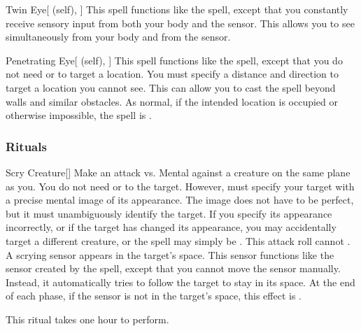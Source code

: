 \lowercase{\hypertarget{spell:Twin Eye}{}}\label{spell:Twin Eye}
\begin{attuneability}[\nth{3}]{\hypertarget{spell:Twin Eye}{Twin Eye}}[ (self), ]
This spell functions like the  spell, except that you constantly receive sensory input from both your body and the sensor.
This allows you to see simultaneously from your body and from the sensor.
\end{attuneability}
\vspace{0.25em}



\lowercase{\hypertarget{spell:Penetrating Eye}{}}\label{spell:Penetrating Eye}
\begin{attuneability}[\nth{4}]{\hypertarget{spell:Penetrating Eye}{Penetrating Eye}}[ (self), ]
This spell functions like the  spell, except that you do not need  or  to target a location.
You must specify a distance and direction to target a location you cannot see.
This can allow you to cast the spell beyond walls and similar obstacles.
As normal, if the intended location is occupied or otherwise impossible, the spell is .
\end{attuneability}
\vspace{0.25em}



\subsubsection{Rituals}


\lowercase{\hypertarget{spell:Scry Creature}{}}\label{spell:Scry Creature}
\begin{apability}[\nth{4}]{\hypertarget{spell:Scry Creature}{Scry Creature}}[]
Make an attack vs. Mental against a creature on the same plane as you.
You do not need  or  to the target.
However,  must specify your target with a precise mental image of its appearance.
The image does not have to be perfect, but it must unambiguously identify the target.
If you specify its appearance incorrectly, or if the target has changed its appearance, you may accidentally target a different creature, or the spell may simply be .
This attack roll cannot .
\hit A scrying sensor appears in the target's space.
This sensor functions like the sensor created by the  spell, except that you cannot move the sensor manually.
Instead, it automatically tries to follow the target to stay in its space.
At the end of each phase, if the sensor is not in the target's space, this effect is .

This ritual takes one hour to perform.
\end{apability}
\vspace{0.25em}



